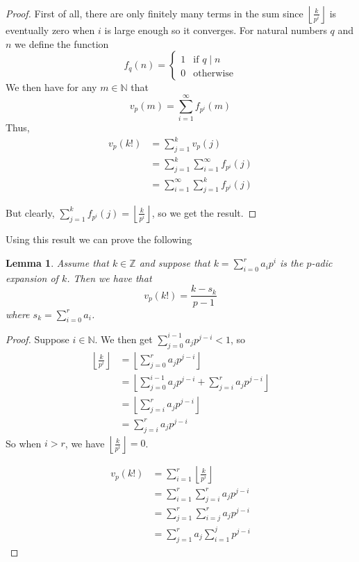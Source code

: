 \documentclass{article}
\newtheorem{lemma}{Lemma}[section]
\newcommand{\mbb}[1]{\mathbb{#1}}
\begin{document}
\begin{proof}
    First of all, there are only finitely many terms in the sum since $\left\lfloor \frac{k}{p^i} \right \rfloor$ is eventually zero when $i$ is large enough so it converges. For natural numbers $q$ and $n$ we define the function 
    $$f_q(n) = \begin{cases}
        1 & \text{if } q \mid n \\
        0 & \text{otherwise}
    \end{cases}$$
    We then have for any $m \in \mbb N$ that
    $$v_p(m) = \sum_{i = 1}^{\infty} f_{p^i}(m)$$
    Thus,
    \begin{align*}
        v_p(k!) &= \sum_{j = 1}^k v_p(j) \\
        &= \sum_{j = 1}^k \sum_{i = 1}^{\infty} f_{p^i}(j) \\
        &= \sum_{i = 1}^{\infty} \sum_{j = 1}^k f_{p^i}(j)
    \end{align*}


    But clearly, $\sum_{j = 1}^k f_{p^i}(j) = \left\lfloor \frac{k}{p^i} \right \rfloor$, so we get the result. 
\end{proof}

Using this result we can prove the following
\begin{lemma}
    Assume that $k \in \mbb Z$ and suppose that $k = \sum_{i = 0}^{r} a_i p^i$ is the $p$-adic expansion of $k$. Then we have that 
    $$v_p(k!) = \frac{k - s_k}{p - 1}$$
    where $s_k = \sum_{i = 0}^{r} a_i$.
\end{lemma}
\begin{proof}
    Suppose $i \in \mbb N$. We then get $\sum_{j = 0}^{i-1}a_j p^{j-i} < 1$, so
    \begin{align*}
        \left\lfloor \frac{k}{p^i} \right \rfloor &= \left \lfloor \sum_{j = 0}^{r} a_j p^{j-i} \right \rfloor \\ 
        &= \left \lfloor \sum_{j = 0}^{i-1}a_j p^{j-i} + \sum_{j=i}^{r} a_j p^{j-i} \right \rfloor \\
        &=  \left \lfloor \sum_{j=i}^{r} a_j p^{j-i} \right \rfloor \\
        &= \sum_{j=i}^{r} a_j p^{j-i}
    \end{align*}
    So when $i > r$, we have $\left\lfloor \frac{k}{p^i} \right \rfloor = 0$.
    
    
    \begin{align*}
        v_p(k!) &= \sum_{i = 1}^{r} \left\lfloor \frac{k}{p^i} \right \rfloor \\
        &= \sum_{i = 1}^{r} \sum_{j=i}^{r} a_j p^{j-i} \\ 
        &= \sum_{j=1}^{r} \sum_{i = j}^{r} a_j p^{j-i} \\
        &= \sum_{j=1}^{r} a_j \sum_{i = 1}^{j} p^{j-i}
    \end{align*}


\end{proof}
\end{document}
